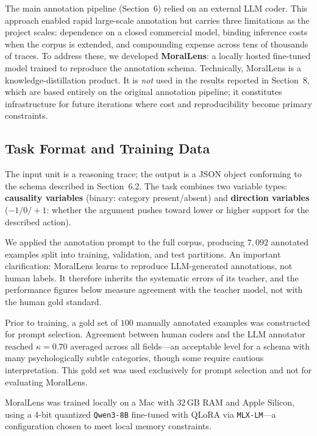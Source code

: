 \documentclass[14pt,a4paper]{extarticle}
\begin{document}
The main annotation pipeline (Section~6) relied on an external LLM coder.
This approach enabled rapid large-scale annotation but carries three limitations
as the project scales: dependence on a closed commercial model, binding inference
costs when the corpus is extended, and compounding expense across tens of
thousands of traces. To address these, we developed \textbf{MoralLens}: a
locally hosted fine-tuned model trained to reproduce the annotation schema.
Technically, MoralLens is a knowledge-distillation product. It is \emph{not}
used in the results reported in Section~8, which are based entirely on the
original annotation pipeline; it constitutes infrastructure for future
iterations where cost and reproducibility become primary constraints.

\subsection{Task Format and Training Data}

The input unit is a reasoning trace; the output is a JSON object conforming to
the schema described in Section~6.2. The task combines two variable types:
\textbf{causality variables} (binary: category present/absent) and
\textbf{direction variables} ($-1/0/+1$: whether the argument pushes toward
lower or higher support for the described action).

We applied the annotation prompt to the full corpus, producing $7{,}092$
annotated examples split into training, validation, and test partitions.
An important clarification: MoralLens learns to reproduce LLM-generated
annotations, not human labels. It therefore inherits the systematic errors of
its teacher, and the performance figures below measure agreement with the
teacher model, not with the human gold standard.

Prior to training, a gold set of $100$ manually annotated examples was
constructed for prompt selection. Agreement between human coders and the LLM
annotator reached $\kappa = 0.70$ averaged across all fields---an acceptable
level for a schema with many psychologically subtle categories, though some
require cautious interpretation. This gold set was used exclusively for prompt
selection and not for evaluating MoralLens.

MoralLens was trained locally on a Mac with $32$\,GB RAM and Apple Silicon,
using a 4-bit quantized \texttt{Qwen3-8B} fine-tuned with QLoRA via
\texttt{MLX-LM}---a configuration chosen to meet local memory constraints.
\end{document}
